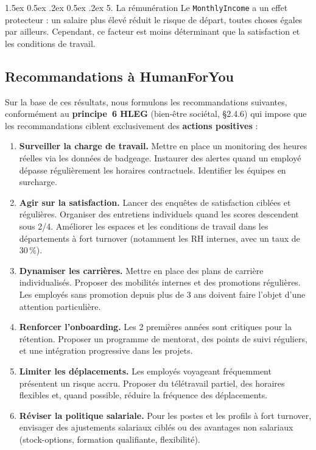 \documentclass[12pt,a4paper]{article}
\makeatletter
\renewcommand\paragraph{\@startsection{paragraph}{4}{\z@}%
  {1.5ex \@plus 0.5ex \@minus .2ex}%
  {0.5ex \@plus .2ex}%
  {\normalfont\normalsize\bfseries}}
\makeatother
\begin{document}
\paragraph{5. La rémunération} Le \texttt{MonthlyIncome} a un effet protecteur : un salaire plus élevé réduit le risque de départ, toutes choses égales par ailleurs. Cependant, ce facteur est moins déterminant que la satisfaction et les conditions de travail.

\subsection{Recommandations à HumanForYou}

Sur la base de ces résultats, nous formulons les recommandations suivantes, conformément au \textbf{principe~6 HLEG} (bien-être sociétal, §2.4.6) qui impose que les recommandations ciblent exclusivement des \textbf{actions positives} :

\begin{enumerate}
    \item \textbf{Surveiller la charge de travail.} Mettre en place un monitoring des heures réelles via les données de badgeage. Instaurer des alertes quand un employé dépasse régulièrement les horaires contractuels. Identifier les équipes en surcharge.

    \item \textbf{Agir sur la satisfaction.} Lancer des enquêtes de satisfaction ciblées et régulières. Organiser des entretiens individuels quand les scores descendent sous 2/4. Améliorer les espaces et les conditions de travail dans les départements à fort turnover (notamment les RH internes, avec un taux de 30\,\%).

    \item \textbf{Dynamiser les carrières.} Mettre en place des plans de carrière individualisés. Proposer des mobilités internes et des promotions régulières. Les employés sans promotion depuis plus de 3 ans doivent faire l'objet d'une attention particulière.

    \item \textbf{Renforcer l'onboarding.} Les 2 premières années sont critiques pour la rétention. Proposer un programme de mentorat, des points de suivi réguliers, et une intégration progressive dans les projets.

    \item \textbf{Limiter les déplacements.} Les employés voyageant fréquemment présentent un risque accru. Proposer du télétravail partiel, des horaires flexibles et, quand possible, réduire la fréquence des déplacements.

    \item \textbf{Réviser la politique salariale.} Pour les postes et les profils à fort turnover, envisager des ajustements salariaux ciblés ou des avantages non salariaux (stock-options, formation qualifiante, flexibilité).
\end{enumerate}
\end{document}
